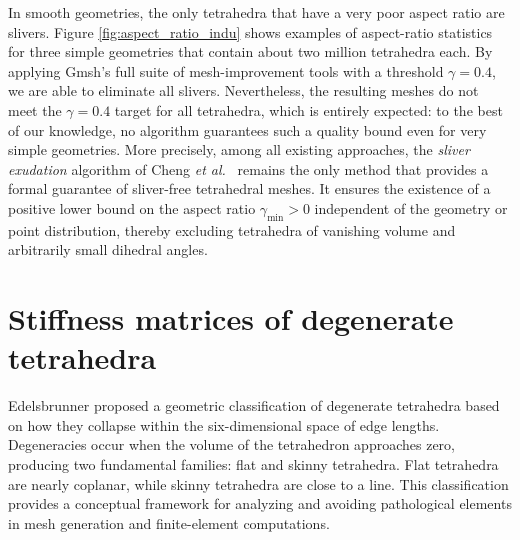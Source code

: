 \documentclass{article}
\begin{document}
In smooth geometries, the only tetrahedra that have a very poor aspect ratio are slivers. Figure \ref{fig:aspect_ratio_indu} shows examples of aspect-ratio statistics for three simple geometries that contain about two million tetrahedra each. By applying Gmsh's full suite of mesh-improvement tools with a threshold \(\gamma = 0.4\), we are able to eliminate all slivers.
Nevertheless, the resulting meshes do not meet the \(\gamma = 0.4\) target for all tetrahedra, which is entirely expected: to the best of our knowledge, no algorithm guarantees such a quality bound even for very simple geometries. More precisely, among all existing approaches, the \emph{sliver exudation} algorithm of Cheng \emph{et al.}~\cite{ChengDeyEdelsbrunnerFacelloTeng2000}
remains the only method that provides a formal guarantee of sliver-free tetrahedral meshes.  
It ensures the existence of a positive lower bound on the aspect ratio
$\gamma_{\min} > 0$
independent of the geometry or point distribution, thereby excluding tetrahedra of vanishing volume and arbitrarily small dihedral angles.


\section{Stiffness matrices of degenerate tetrahedra}
\label{sec:deg}
Edelsbrunner \cite{Edelsbrunner2001} proposed a geometric classification of degenerate tetrahedra based on how they collapse within the six-dimensional space of edge lengths. Degeneracies occur when the volume of the tetrahedron approaches zero, producing two fundamental families: flat and skinny tetrahedra. Flat tetrahedra are nearly coplanar, while skinny tetrahedra are close to a line. This classification provides a conceptual framework for analyzing and avoiding pathological elements in mesh generation and finite-element computations.
\end{document}
